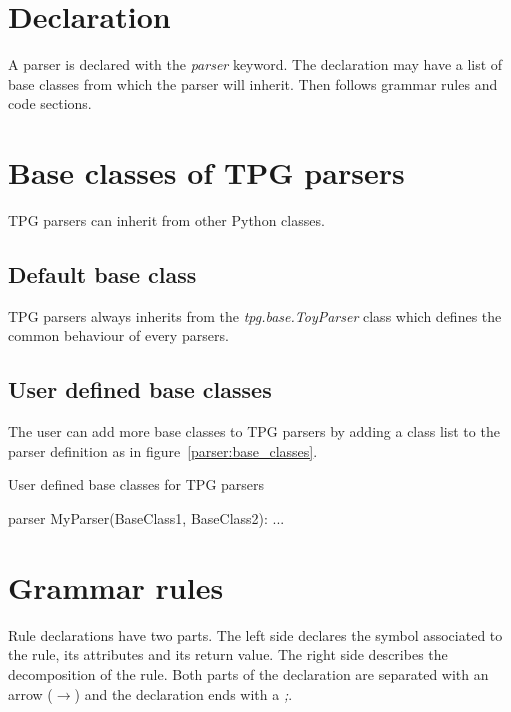 \section{Declaration}

A parser is declared with the \emph{parser} keyword.
The declaration may have a list of base classes from which the parser will inherit.
Then follows grammar rules and code sections.

\section{Base classes of TPG parsers}							\label{parser:inheritance}

TPG parsers can inherit from other Python classes.

\subsection{Default base class}

TPG parsers always inherits from the \emph{tpg.base.ToyParser} class which defines the common behaviour of every parsers.

\subsection{User defined base classes}

The user can add more base classes to TPG parsers by adding a class list to the parser definition as in figure~\ref{parser:base_classes}.

\begin{code}
\caption{User defined base classes for TPG parsers}				\label{parser:base_classes}
\begin{verbatimtab}[4]
parser MyParser(BaseClass1, BaseClass2):
	...
\end{verbatimtab}
\end{code}

\section{Grammar rules}											\label{parser:grammar_rules}

Rule declarations have two parts.
The left side declares the symbol associated to the rule, its attributes and its return value.
The right side describes the decomposition of the rule.
Both parts of the declaration are separated with an arrow (\emph{$\to$})
and the declaration ends with a \emph{;}.

